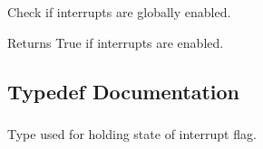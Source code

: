 Check if interrupts are globally enabled. 

\begin{DoxyReturn}{Returns}
True if interrupts are enabled. 
\end{DoxyReturn}


\subsection{Typedef Documentation}
\hypertarget{group__interrupt__group_ga9aa1f52defc97531b6343233abeea613}{
\subsubsection[{irqflags\-\_\-t}]{}}\label{group__interrupt__group_ga9aa1f52defc97531b6343233abeea613}


Type used for holding state of interrupt flag. 

